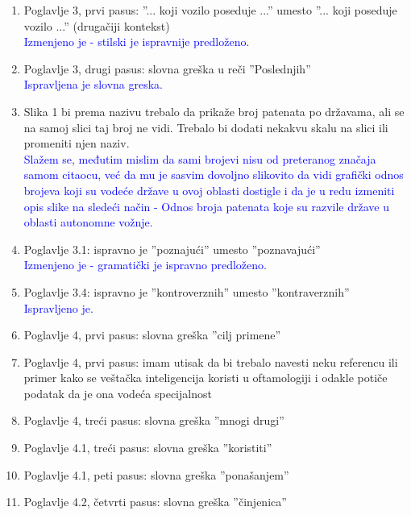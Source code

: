 \documentclass[a4paper]{report}
\newcommand{\odgovor}[1]{\textcolor{blue}{#1}}
\begin{document}
\begin{enumerate}
\item Poglavlje 3, prvi pasus: ''... koji vozilo poseduje ...'' umesto ''... koji poseduje vozilo ...'' (drugačiji kontekst) \\
\odgovor{Izmenjeno je - stilski je ispravnije predloženo.}

\item Poglavlje 3, drugi pasus: slovna greška u reči ''Poslednjih'' \\
\odgovor{Ispravljena je slovna greska.}

\item Slika 1 bi prema nazivu trebalo da prikaže broj patenata po državama, ali se na samoj slici taj broj ne vidi. Trebalo bi dodati nekakvu skalu na slici ili promeniti njen naziv. \\
\odgovor{Slažem se, međutim mislim da sami brojevi nisu od preteranog značaja samom citaocu, već da mu je sasvim dovoljno slikovito da vidi grafički odnos brojeva koji su vodeće države u ovoj oblasti dostigle i da je u redu izmeniti opis slike na sledeći način -  Odnos broja patenata koje su razvile države u oblasti autonomne vožnje.}

\item Poglavlje 3.1: ispravno je ''poznajući'' umesto ''poznavajući'' \\
\odgovor{Izmenjeno je - gramatički je ispravno predloženo.} 

\item Poglavlje 3.4: ispravno je ''kontroverznih'' umesto ''kontraverznih'' \\
\odgovor{Ispravljeno je.}

\item Poglavlje 4, prvi pasus: slovna greška ''cilj primene''

\item Poglavlje 4, prvi pasus: imam utisak da bi trebalo navesti neku referencu ili primer kako se veštačka inteligencija koristi u oftamologiji i odakle potiče podatak da je ona vodeća specijalnost 

\item Poglavlje 4, treći pasus: slovna greška ''mnogi drugi''

\item Poglavlje 4.1, treći pasus: slovna greška ''koristiti''

\item Poglavlje 4.1, peti pasus: slovna greška ''ponašanjem''

\item Poglavlje 4.2, četvrti pasus: slovna greška ''činjenica''


\end{enumerate}
\end{document}
